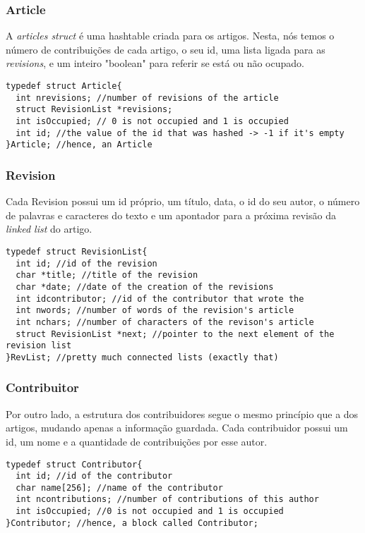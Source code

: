 \documentclass{article}
\begin{document}
\subsubsection{Article}
 A \emph{articles struct} é uma hashtable criada para os artigos. Nesta, nós temos o número de contribuições de cada artigo, o seu id, uma lista ligada para as \emph{revisions}, e um inteiro "boolean" para referir se está ou não ocupado.

\begin{lstlisting}
typedef struct Article{
  int nrevisions; //number of revisions of the article
  struct RevisionList *revisions;
  int isOccupied; // 0 is not occupied and 1 is occupied
  int id; //the value of the id that was hashed -> -1 if it's empty
}Article; //hence, an Article
\end{lstlisting}

\subsubsection{Revision}
\par Cada Revision possui um id próprio, um título, data, o id do seu autor, o número de palavras e caracteres do texto e um apontador para a próxima revisão da \emph{linked list} do artigo.

\begin{lstlisting}
typedef struct RevisionList{
  int id; //id of the revision
  char *title; //title of the revision
  char *date; //date of the creation of the revisions
  int idcontributor; //id of the contributor that wrote the
  int nwords; //number of words of the revision's article
  int nchars; //number of characters of the revison's article
  struct RevisionList *next; //pointer to the next element of the revision list
}RevList; //pretty much connected lists (exactly that)
\end{lstlisting}

\subsubsection{Contribuitor}
\par Por outro lado, a estrutura dos contribuidores segue o mesmo princípio que a dos artigos, mudando apenas a informação guardada. Cada contribuidor possui um id, um nome e a quantidade de contribuições por esse autor.

\begin{lstlisting}
typedef struct Contributor{
  int id; //id of the contributor
  char name[256]; //name of the contributor
  int ncontributions; //number of contributions of this author
  int isOccupied; //0 is not occupied and 1 is occupied
}Contributor; //hence, a block called Contributor;
\end{lstlisting}
\end{document}
